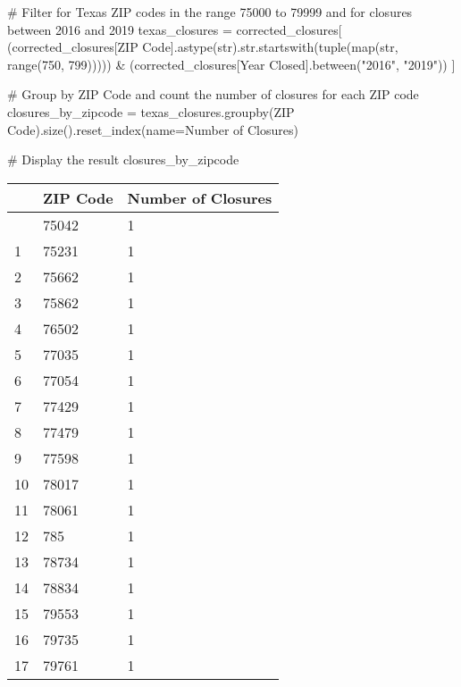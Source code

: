 \documentclass[
  letterpaper,
  DIV=11,
  numbers=noendperiod]{scrartcl}
\newenvironment{Shaded}{\begin{snugshade}}{\end{snugshade}}
\newcommand{\BuiltInTok}[1]{\textcolor[rgb]{0.00,0.23,0.31}{#1}}
\newcommand{\CommentTok}[1]{\textcolor[rgb]{0.37,0.37,0.37}{#1}}
\newcommand{\DecValTok}[1]{\textcolor[rgb]{0.68,0.00,0.00}{#1}}
\newcommand{\NormalTok}[1]{\textcolor[rgb]{0.00,0.23,0.31}{#1}}
\newcommand{\OperatorTok}[1]{\textcolor[rgb]{0.37,0.37,0.37}{#1}}
\newcommand{\StringTok}[1]{\textcolor[rgb]{0.13,0.47,0.30}{#1}}
\begin{document}
\begin{Shaded}
\begin{Highlighting}[]
\CommentTok{\# Filter for Texas ZIP codes in the range 75000 to 79999 and for closures between 2016 and 2019}
\NormalTok{texas\_closures }\OperatorTok{=}\NormalTok{ corrected\_closures[}
\NormalTok{    (corrected\_closures[}\StringTok{\textquotesingle{}ZIP Code\textquotesingle{}}\NormalTok{].astype(}\BuiltInTok{str}\NormalTok{).}\BuiltInTok{str}\NormalTok{.startswith(}\BuiltInTok{tuple}\NormalTok{(}\BuiltInTok{map}\NormalTok{(}\BuiltInTok{str}\NormalTok{, }\BuiltInTok{range}\NormalTok{(}\DecValTok{750}\NormalTok{, }\DecValTok{799}\NormalTok{))))) }\OperatorTok{\&} 
\NormalTok{    (corrected\_closures[}\StringTok{\textquotesingle{}Year Closed\textquotesingle{}}\NormalTok{].between(}\StringTok{"2016"}\NormalTok{, }\StringTok{"2019"}\NormalTok{))}
\NormalTok{]}

\CommentTok{\# Group by ZIP Code and count the number of closures for each ZIP code}
\NormalTok{closures\_by\_zipcode }\OperatorTok{=}\NormalTok{ texas\_closures.groupby(}\StringTok{\textquotesingle{}ZIP Code\textquotesingle{}}\NormalTok{).size().reset\_index(name}\OperatorTok{=}\StringTok{\textquotesingle{}Number of Closures\textquotesingle{}}\NormalTok{)}

\CommentTok{\# Display the result}
\NormalTok{closures\_by\_zipcode}
\end{Highlighting}
\end{Shaded}

\begin{longtable}[]{@{}lll@{}}
\toprule\noalign{}
& ZIP Code & Number of Closures \\
\midrule\noalign{}
\endhead
\bottomrule\noalign{}
\endlastfoot
0 & 75042 & 1 \\
1 & 75231 & 1 \\
2 & 75662 & 1 \\
3 & 75862 & 1 \\
4 & 76502 & 1 \\
5 & 77035 & 1 \\
6 & 77054 & 1 \\
7 & 77429 & 1 \\
8 & 77479 & 1 \\
9 & 77598 & 1 \\
10 & 78017 & 1 \\
11 & 78061 & 1 \\
12 & 785 & 1 \\
13 & 78734 & 1 \\
14 & 78834 & 1 \\
15 & 79553 & 1 \\
16 & 79735 & 1 \\
17 & 79761 & 1 \\
\end{longtable}
\end{document}
